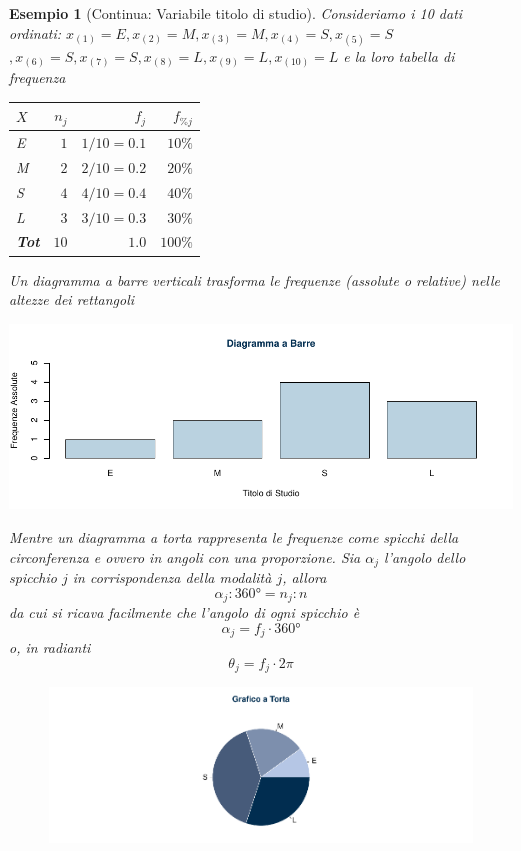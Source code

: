 \documentclass[
  11pt,
]{book}
\theoremstyle{mytheoremstyle}
\theoremstyle{mydefstyle}
\newtheorem{example}{{Esempio}}[section]
\begin{document}
\begin{example}[Continua: Variabile titolo di studio]

Consideriamo i 10 dati ordinati:
\(x_{(1)}=E,x_{(2)}=M,x_{(3)}=M,x_{(4)}=S,x_{(5)}=S\)
\(,x_{(6)}=S,x_{(7)}=S,x_{(8)}=L,x_{(9)}=L,x_{(10)}=L\)
e la loro tabella di frequenza

\begin{table}[!h]
\centering
\begin{tabular}{lrrr}
\toprule
$X$ & $n_j$ & $f_j$ & $f_{\% j}$\\
\midrule
E & $1$ & $1/10=0.1$ & $10\%$\\
M & $2$ & $2/10=0.2$ & $20\%$\\
S & $4$ & $4/10=0.4$ & $40\%$\\
L & $3$ & $3/10=0.3$ & $30\%$\\
\midrule
\textbf{Tot} & \textbf{$10$} & \textbf{$1.0$} & \textbf{$100\%$}\\
\midrule
\bottomrule
\end{tabular}
\end{table}

Un diagramma a barre verticali trasforma le frequenze (assolute o relative)
nelle altezze dei rettangoli

\begin{center}\includegraphics{Appunti_di_Statistica_2025_files/figure-latex/unnamed-chunk-7-1} \end{center}

Mentre un diagramma a torta rappresenta le frequenze come spicchi della circonferenza
e ovvero in angoli con una proporzione. Sia \(\alpha_j\) l'angolo dello spicchio \(j\)
in corrispondenza della modalità \(j\), allora
\[
\alpha_j : 360°=n_j:n
\]
da cui si ricava facilmente che l'angolo di ogni spicchio è
\[
\alpha_j =f_j \cdot 360°
\]
o, in radianti
\[
\theta_j =f_j \cdot 2\pi
\]

\begin{figure}[H]

{\centering \includegraphics{Appunti_di_Statistica_2025_files/figure-latex/unnamed-chunk-8-1} 

}
\end{figure}
\end{example}
\end{document}
